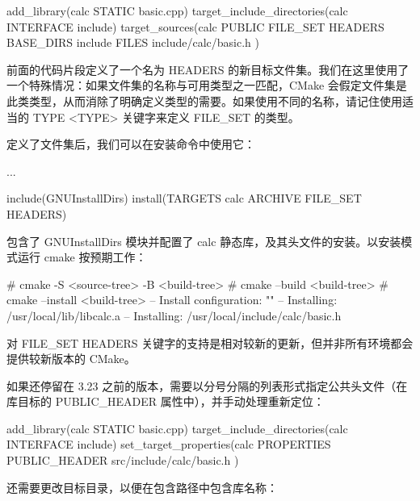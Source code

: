 
\begin{cmake}
add_library(calc STATIC basic.cpp)
target_include_directories(calc INTERFACE include)
target_sources(calc PUBLIC FILE_SET HEADERS
                           BASE_DIRS include
                           FILES include/calc/basic.h
)
\end{cmake}

前面的代码片段定义了一个名为 HEADERS 的新目标文件集。我们在这里使用了一个特殊情况：如果文件集的名称与可用类型之一匹配，CMake 会假定文件集是此类类型，从而消除了明确定义类型的需要。如果使用不同的名称，请记住使用适当的 TYPE <TYPE> 关键字来定义 FILE\_SET 的类型。

定义了文件集后，我们可以在安装命令中使用它：


\begin{cmake}
...

include(GNUInstallDirs)
install(TARGETS calc ARCHIVE FILE_SET HEADERS)
\end{cmake}

包含了 GNUInstallDirs 模块并配置了 calc 静态库，及其头文件的安装。以安装模式运行 cmake 按预期工作：

\begin{shell}
# cmake -S <source-tree> -B <build-tree>
# cmake --build <build-tree>
# cmake --install <build-tree>
-- Install configuration: ""
-- Installing: /usr/local/lib/libcalc.a
-- Installing: /usr/local/include/calc/basic.h
\end{shell}

对 FILE\_SET HEADERS 关键字的支持是相对较新的更新，但并非所有环境都会提供较新版本的 CMake。

如果还停留在 3.23 之前的版本，需要以分号分隔的列表形式指定公共头文件（在库目标的 PUBLIC\_HEADER 属性中），并手动处理重新定位：


\begin{cmake}
add_library(calc STATIC basic.cpp)
target_include_directories(calc INTERFACE include)
set_target_properties(calc PROPERTIES
    PUBLIC_HEADER src/include/calc/basic.h
)
\end{cmake}

还需要更改目标目录，以便在包含路径中包含库名称：


